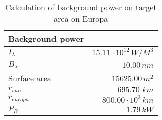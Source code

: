 \begin{table}[H]
\centering
\caption{Calculation of background power on target area on Europa}
\label{tab:background_power}
\begin{tabular}{|l|r|}\hline
    \textbf{Background power} & \\
    \hline 
    $I_\lambda$ & $15.11\cdot10^{12}\,W/M^3$ \\
    $B_\lambda$ & $10.00\,n m$ \\
    Surface area & $15625.00\, m^2$ \\
    $r_{sun}$ & $695.70\,\,km$ \\
    $r_{europa}$ & $800.00\cdot10^3\,km$ \\
    $P_B$ & $1.79\,k W$ \\
    \hline 
\end{tabular}
\end{table}
